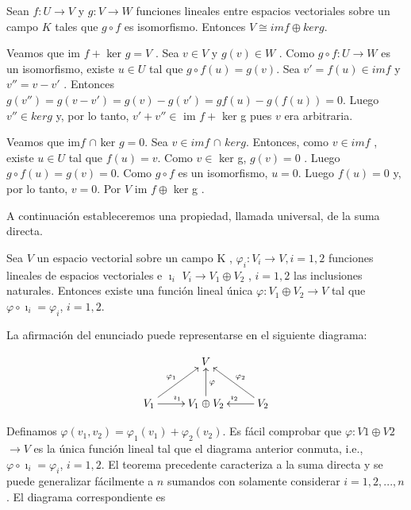			\begin{coro}
				Sean $ f : U \rightarrow V $ y $ g: V \rightarrow W $ funciones lineales entre espacios vectoriales sobre un campo $ K $ tales que $ g \circ f $ es isomorfismo.
				Entonces $ V  \cong im f \oplus ker g $.
			\end{coro}
		
			\begin{demo}
				Veamos que  im $ f + $ ker $ g = V $  . Sea $ v \in V $ y $ g(v) \in W $ . Como $ g \circ f : U \rightarrow W $ es un isomorfismo, existe $  u \in U $ tal que $ g \circ f(u) = g(v) $. Sea $ v' = f (u) \in im f $ y $ v'' = v - v' $ . Entonces $ g(v'') = g(v - v' ) = g(v) - g(v' ) = gf (u) - g(f (u)) = 0 $. Luego $ v'' \in ker g $ y, por lo tanto, $ v' + v'' \in$ im $ f + $ ker g  pues $ v $ era arbitraria.
				
				Veamos que im$ f$ $\cap $ ker $g = {0} $. Sea $ v \in im f$ $  \cap $ $ker g $. Entonces, como $ v \in im f $ , existe $ u \in U $ tal que $ f (u) = v $. Como $ v \in $ ker g, $ g(v) = 0 $ . Luego $ g \circ f(u) = g(v) = 0 $.
				Como $ g \circ f $ es un isomorfismo, $ u = 0 $. Luego $ f(u) = 0 $ y, por lo tanto, $ v = 0 $. Por
				$ V $  im $ f  \oplus $ ker g .
			\end{demo}
			
			A continuación estableceremos una propiedad, llamada universal, de la suma
			directa.
			 \begin{teo}
			 	Sea $ V $ un espacio vectorial sobre un campo K ,
			 	$ \varphi_{i} : V_{i} \rightarrow V , i = 1, 2 $ funciones lineales de espacios vectoriales e $\imath_{i} $ $ V_{i} \rightarrow V_{1} \oplus V_{2}$ , $ i = 1, 2 $ las inclusiones naturales. 
			 	Entonces existe una función lineal única $ \varphi : V_{1} \oplus V_{2} \rightarrow V $ tal que $ \varphi \circ \imath_{i} = \varphi_{i} $, $ i = 1, 2 $.
			 	\end{teo}
		 		\begin{demo}
		 			La afirmación del enunciado puede representarse en el siguiente diagrama:	 
		 		\end{demo}
	 		 \[  \xymatrix{
	 		 	&V \\
	 		  	V_{1} \ar[r]^{\imath_{1}} \ar[ru]^{\varphi_{1}} & V_{1} \oplus V_{2} \ar[u]_{\varphi} & V_{2}\ar[l]_{\imath_{2}} \ar[lu]_{\varphi_{2}}
	 		  }
	 		   \]
	 		  
	 		  Definamos $\varphi(v_{1} , v_{2}) = \varphi_{1} (v_{1}) + \varphi_{2} (v_{2})$. Es fácil comprobar que $ \varphi: V1 \oplus V2 $ $\rightarrow V$
	 		  es la única  función lineal tal que el diagrama anterior conmuta, i.e., $ \varphi \circ \imath_{i} = \varphi_{i} $, $  i = 1, 2 $.
	 		  El teorema precedente caracteriza a la suma directa y se puede generalizar
	 		  fácilmente a $ n $ sumandos con solamente considerar $ i = 1, 2, . . . , n $. El diagrama
	 		  correspondiente es
	 		   
